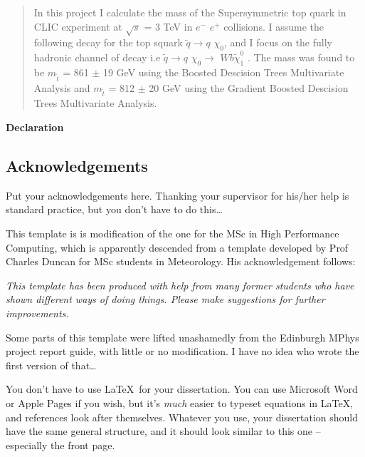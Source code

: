 \documentclass[12pt,a4paper]{report}
\begin{document}
\newpage



\begin{abstract}
In this project I calculate the mass of the Supersymmetric top quark in CLIC experiment at $\sqrt{s}$ = 3 TeV in $e^{-}$ $e^{+}$ collisions. I assume the following decay for the top squark $\tilde{q} \rightarrow q$ $\chi_{0}$, 
and I focus on the fully hadronic channel of decay i.e $\tilde{q} \rightarrow q$ $\chi_{0} \rightarrow$ $W b \tilde{\chi}_{1}^{0}$ .
The mass was found  to be  $m_{\tilde{t}}$ = 861 $\pm$ 19 GeV using the Boosted Descision 
Trees Multivariate Analysis and $m_{\tilde{t}}$ = 812 $\pm$ 20 GeV using the Gradient Boosted Descision  Trees Multivariate Analysis. 
\end{abstract}



\textbf{Declaration}


\newpage

\tableofcontents
\listoftables
\listoffigures

\begin{titlepage}
\vspace*{2in}
\section*{Acknowledgements}

Put your acknowledgements here. Thanking your supervisor for his/her
help is standard practice, but you don't have to do this\ldots

This template is is modification of the one for the MSc in High
Performance Computing, which is apparently descended from a template
developed by Prof Charles Duncan for MSc students in Meteorology. His
acknowledgement follows:

\emph{This template has been produced with help from many former
  students who have shown different ways of doing things. Please make
  suggestions for further improvements.}

Some parts of this template were lifted unashamedly from the Edinburgh
MPhys project report guide, with little or no modification. I have no
idea who wrote the first version of that\ldots

You don't have to use \LaTeX\ for your dissertation. You can use
Microsoft Word or Apple Pages if you wish, but it's \emph{much} easier
to typeset equations in \LaTeX, and references look after
themselves. Whatever you use, your dissertation should have the same
general structure, and it should look similar to this one --
especially the front page.


\end{titlepage}
\end{document}

